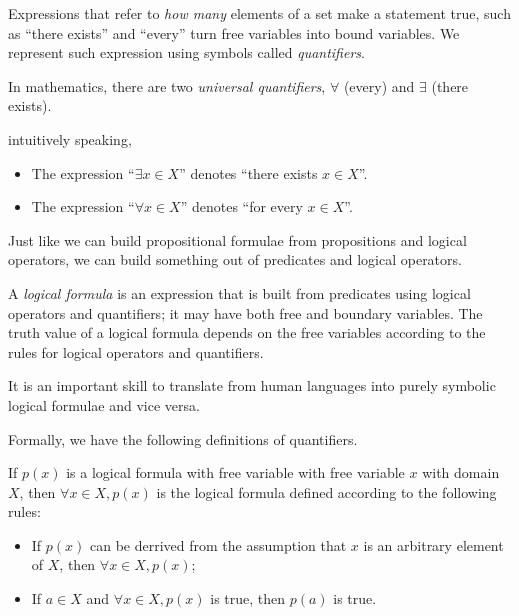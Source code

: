 Expressions that refer to \emph{how many} elements of a set make a statement true,
such as ``there exists'' and ``every'' turn free variables into bound variables.
We represent such expression using symbols called \emph{quantifiers}.

In mathematics, there are two \emph{universal quantifiers}, 
$\forall$ (every) and $\exists$ (there exists).

\begin{example}
    intuitively speaking,
   \begin{itemize}
       \item The expression ``$\exists x \in X$'' denotes ``there exists $x\in X$''.
        \item The expression ``$\forall x\in X$'' denotes ``for every $x\in X$''.
   \end{itemize} 
\end{example}

Just like we can build propositional formulae from propositions and logical operators, 
we can build something out of predicates and logical operators.
\begin{definition}
    A \emph{logical formula} is an expression that is built from predicates using logical
    operators and quantifiers; it may have both free and boundary variables.
    The truth value of a logical formula depends on the free variables according 
    to the rules for logical operators and quantifiers.
\end{definition}
It is an important skill to translate from human languages into purely symbolic logical formulae
and vice versa.

Formally, we have the following definitions of quantifiers.

\begin{definition}
    If $p(x)$ is a logical formula with free variable with free variable $x$ with domain $X$,
    then $\forall x\in X, p(x)$ is the logical formula defined according to the following rules:
    \begin{itemize}
        \item If $p(x)$ can be derrived from the assumption that $x$ is an arbitrary element of $X$,
            then $\forall x\in X, p(x)$;
        \item If $a\in X$ and  $\forall x \in X, p(x)$ is true, then $p(a)$ is true.
    \end{itemize}
\end{definition}

